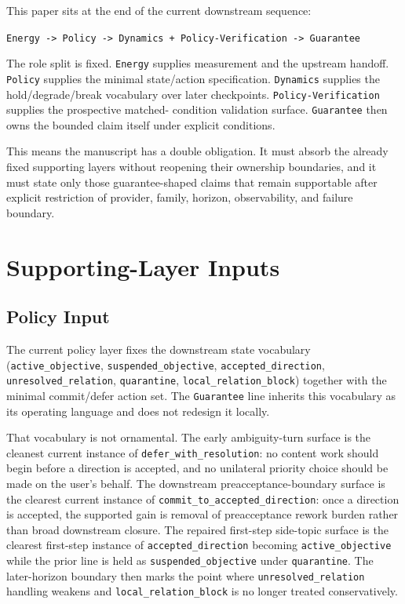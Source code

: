 \documentclass[11pt]{article}
\begin{document}
This paper sits at the end of the current downstream sequence:

\begin{center}
\texttt{Energy -> Policy -> Dynamics + Policy-Verification -> Guarantee}
\end{center}

\noindent The role split is fixed. \texttt{Energy} supplies measurement and the
upstream handoff. \texttt{Policy} supplies the minimal state/action
specification. \texttt{Dynamics} supplies the hold/degrade/break vocabulary over
later checkpoints. \texttt{Policy-Verification} supplies the prospective matched-
condition validation surface. \texttt{Guarantee} then owns the bounded claim
itself under explicit conditions.

This means the manuscript has a double obligation. It must absorb the already
fixed supporting layers without reopening their ownership boundaries, and it must
state only those guarantee-shaped claims that remain supportable after explicit
restriction of provider, family, horizon, observability, and failure boundary.

\section{Supporting-Layer Inputs}

\subsection{Policy Input}

The current policy layer fixes the downstream state vocabulary
(\texttt{active\_objective}, \texttt{suspended\_objective},
\texttt{accepted\_direction}, \texttt{unresolved\_relation},
\texttt{quarantine}, \texttt{local\_relation\_block}) together with the minimal
commit/defer action set. The \texttt{Guarantee} line inherits this vocabulary as
its operating language and does not redesign it locally.

That vocabulary is not ornamental. The early ambiguity-turn surface is the
cleanest current instance of \texttt{defer\_with\_resolution}: no content work
should begin before a direction is accepted, and no unilateral priority choice
should be made on the user's behalf. The downstream preacceptance-boundary
surface is the clearest current instance of
\texttt{commit\_to\_accepted\_direction}: once a direction is accepted, the
supported gain is removal of preacceptance rework burden rather than broad
downstream closure. The repaired first-step side-topic surface is the clearest
first-step instance of \texttt{accepted\_direction} becoming
\texttt{active\_objective} while the prior line is held as
\texttt{suspended\_objective} under \texttt{quarantine}. The later-horizon
boundary then marks the point where \texttt{unresolved\_relation} handling
weakens and \texttt{local\_relation\_block} is no longer treated conservatively.
\end{document}
